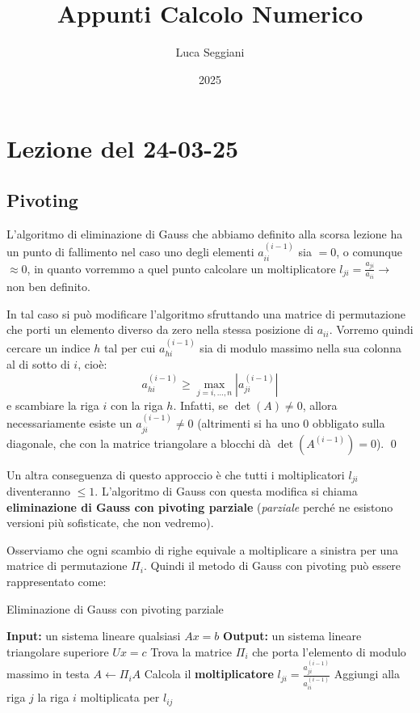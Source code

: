 \documentclass[a4paper,11pt]{article}
\title{Appunti Calcolo Numerico}
\author{Luca Seggiani}
\date{2025}
\begin{document}
\section{Lezione del 24-03-25}

\thispagestyle{empty}
\pagestyle{fancy}

\subsection{Pivoting}
L'algoritmo di eliminazione di Gauss che abbiamo definito alla scorsa lezione ha un punto di fallimento nel caso uno degli elementi $a_{ii}^{(i - 1)}$ sia $= 0$, o comunque $\approx 0$, in quanto vorremmo a quel punto calcolare un moltiplicatore $l_{ji} = \frac{a_{ji}}{a_{ii}} \rightarrow$ non ben definito.

In tal caso si può modificare l'algoritmo sfruttando una matrice di permutazione che porti un elemento diverso da zero nella stessa posizione di $a_{ii}$.
Vorremo quindi cercare un indice $h$ tal per cui $a_{hi}^{(i - 1)}$ sia di modulo massimo nella sua colonna al di sotto di $i$, cioè:
$$
a_{hi}^{(i - 1)} \geq \max_{j = i, ..., n} | a_{ji}^{(i - 1)} |
$$
e scambiare la riga $i$ con la riga $h$.
Infatti, se $\det(A) \neq 0$, allora necessariamente esiste un $a_{ji}^{(i - 1)} \neq 0$ (altrimenti si ha uno 0 obbligato sulla diagonale, che con la matrice triangolare a blocchi dà $\det(A^{(i - 1)}) = 0$). \qed

Un altra conseguenza di questo approccio è che tutti i moltiplicatori $l_{ji}$ diventeranno $\leq 1$.
L'algoritmo di Gauss con questa modifica si chiama \textbf{eliminazione di Gauss con pivoting parziale} (\textit{parziale} perché ne esistono versioni più sofisticate, che non vedremo).

Osserviamo che ogni scambio di righe equivale a moltiplicare a sinistra per una matrice di permutazione $\Pi_i$.
Quindi il metodo di Gauss con pivoting può essere rappresentato come:
\begin{algorithm}
\caption{Eliminazione di Gauss con pivoting parziale}
\begin{algorithmic}
	\STATE \textbf{Input:} un sistema lineare qualsiasi $Ax = b$ %
	\STATE \textbf{Output:} un sistema lineare triangolare superiore $Ux = c$ %
		\STATE Trova la matrice $\Pi_i$ che porta l'elemento di modulo massimo in testa
		\STATE $A \leftarrow \Pi_i A$
			\STATE Calcola il \textbf{moltiplicatore} $l_{ji} = \frac{a_{ji}^{(i - 1)}}{a_{ii}^{(i - 1)}}$
			\STATE Aggiungi alla riga $j$ la riga $i$ moltiplicata per $l_{ij}$
		\ENDFOR
	\ENDFOR
\end{algorithmic}
\end{algorithm}
\end{document}
